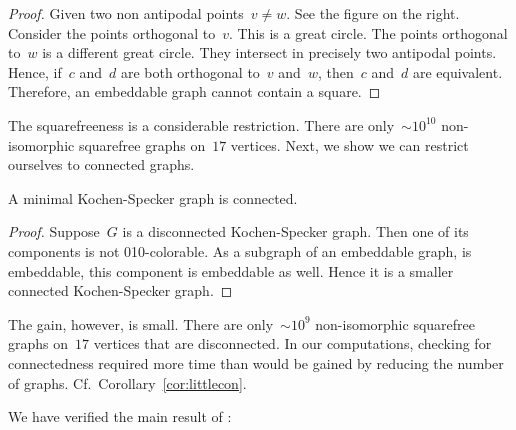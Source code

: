 \documentclass{report}
\begin{document}
\begin{proof}
    Given two non antipodal points~$v\neq w$.
    See the figure on the right.
    Consider the points orthogonal to~$v$.
    This is a great circle.
    The points orthogonal to~$w$ is a different great circle.
    They intersect in precisely two antipodal points.
    Hence, if~$c$ and~$d$ are both orthogonal to~$v$ and~$w$,
    then~$c$ and~$d$ are equivalent.
    Therefore, an embeddable graph cannot contain a square.
\end{proof}

The squarefreeness is a considerable restriction.  There are
only~${\sim}10^{10}$ non-isomorphic squarefree graphs on~$17$
vertices.\cite{sf-sloane}
Next, we show we can restrict ourselves to connected graphs.
\begin{proposition}\label{prop:ks-conn}
    A minimal Kochen-Specker graph is connected.
\end{proposition}
\begin{proof}
    Suppose~$G$ is a disconnected Kochen-Specker graph.
    Then one of its components is not 010-colorable.
    As a subgraph of an embeddable graph, is embeddable,
    this component is embeddable as well.
    Hence it is a smaller connected Kochen-Specker graph.
\end{proof}
The gain, however, is small.
There are only~${\sim}10^9$ non-isomorphic squarefree graphs on~$17$
vertices that are disconnected.
In our computations, checking for connectedness
required more time than would be gained by reducing the number of graphs.
Cf.~Corollary~\ref{cor:littlecon}.

We have verified the main result of \cite{aow11}:

\end{document}
